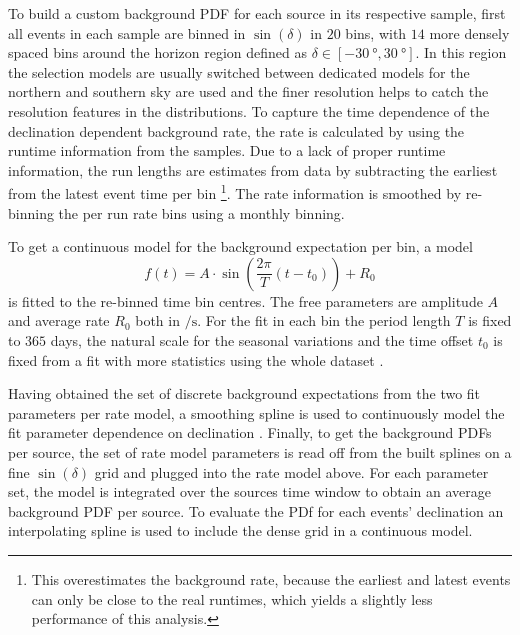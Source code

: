 To build a custom background PDF for each source in its respective sample, first all events in each sample are binned in $\sin(\delta)$ in $\num{20}$ bins, with $\num{14}$ more densely spaced bins around the horizon region defined as $\delta\in[\SI{-30}{\degree}, \SI{30}{\degree}]$.
In this region the selection models are usually switched between dedicated models for the northern and southern sky are used and the finer resolution helps to catch the resolution features in the distributions.
To capture the time dependence of the declination dependent background rate, the rate is calculated by using the runtime information from the samples.
Due to a lack of proper runtime information, the run lengths are estimates from data by subtracting the earliest from the latest event time per bin \footnote{This overestimates the background rate, because the earliest and latest events can only be close to the real runtimes, which yields a slightly less performance of this analysis.}.
The rate information is smoothed by re-binning the per run rate bins using a monthly binning.

To get a continuous model for the background expectation per bin, a model
\begin{equation}
  f(t)
  = A\cdot
    \sin\left(\frac{2\pi}{T}\left(t - t_0\right)\right) + R_0
\end{equation}
is fitted to the re-binned time bin centres.
The free parameters are amplitude $A$ and average rate $R_0$ both in $\si{\per\s}$.
For the fit in each bin the period length $T$ is fixed to $365$ days, the natural scale for the seasonal variations and the time offset $t_0$ is fixed from a fit with more statistics using the whole dataset .

Having obtained the set of discrete background expectations from the two fit parameters per rate model, a smoothing spline is used to continuously model the fit parameter dependence on declination .
Finally, to get the background PDFs per source, the set of rate model parameters is read off from the built splines on a fine $\sin(\delta)$ grid and plugged into the rate model above.
For each parameter set, the model is integrated over the sources time window to obtain an average background PDF per source.
To evaluate the PDf for each events' declination an interpolating spline is used to include the dense grid in a continuous model.

